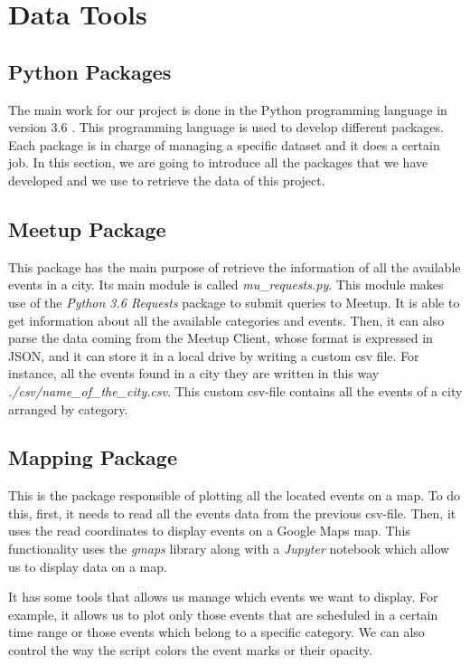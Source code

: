 \section{Data Tools}\label{sec:toolsanddata}
\subsection{Python Packages} 
The main work for our project is done in the Python programming language in version 3.6 \cite{python}. This programming language is used to develop different packages. Each package is in charge of managing a specific dataset and it does a certain job. In this section, we are going to introduce all the packages that we have developed and we use to retrieve the data of this project.

\subsection{Meetup Package}
This package has the main purpose of retrieve the information of all the available events in a city. Its main module is called \textit{mu\_requests.py}. This module makes use of the \textit{Python 3.6 Requests} package to submit queries to Meetup. It is able to get information about all the available categories and events. Then, it can also parse the data coming from the Meetup Client, whose format is expressed in JSON, and it can store it in a local drive by writing a custom csv file. For instance, all the events found in a city they are written in this way \textit{./csv/name\_of\_the\_city.csv}. This custom csv-file contains all the events of a city arranged by category.

\subsection{Mapping Package}
This is the package responsible of plotting all the located events on a map. To do this, first, it needs to read all the events data from the previous csv-file. Then, it uses the read coordinates to display events on a Google Maps map. This functionality uses the \textit{gmaps} library along with a \textit{Jupyter} notebook which allow us to display data on a map.

It has some tools that allows us manage which events we want to display. For example, it allows us to plot only those events that are scheduled in a certain time range or those events which belong to a specific category. We can also control the way the script colors the event marks or their opacity.

